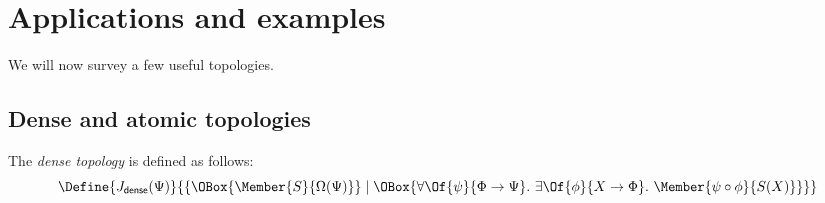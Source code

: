\documentclass{article}
\newcommand\JDense{J_{\mathsf{dense}}}
\newcommand\MkSet[1]{\{#1\}}
\begin{document}

\newpage
\section{Applications and examples}

We will now survey a few useful topologies.

\subsection{Dense and atomic topologies}

\begin{definition}
  The \emph{dense topology} is defined as follows:
  \[
    \Define{
      \JDense(\Psi)
    }{
      \MkSet{
        \OBox{
          \Member{S}{\Omega(\Psi)}
        }
        \mid
        \OBox{
          \forall\Of{\psi}{\Phi\to\Psi}.\
          \exists\Of{\phi}{X\to\Phi}.\
          \Member{\psi\circ \phi}{S(X)}
        }
      }
    }
  \]
\end{definition}
\end{document}
